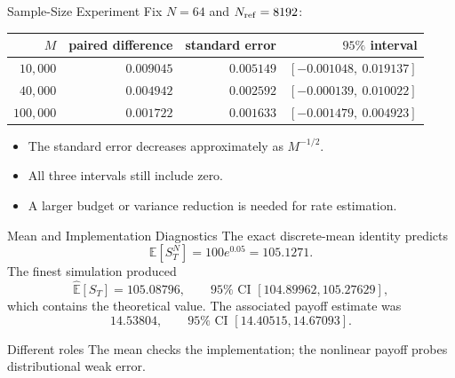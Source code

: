 \documentclass[aspectratio=169,10pt]{beamer}
\newcommand{\E}{\mathbb{E}}
\begin{document}
\begin{frame}{Sample-Size Experiment}
  Fix $N=64$ and $N_{\rm ref}=8192$:
  \begin{center}
    \begin{tabular}{rrrr}
      \toprule
      $M$ & paired difference & standard error & $95\%$ interval \\
      \midrule
      $10{,}000$  & $0.009045$ & $0.005149$ & $[-0.001048,\ 0.019137]$ \\
      $40{,}000$  & $0.004942$ & $0.002592$ & $[-0.000139,\ 0.010022]$ \\
      $100{,}000$ & $0.001722$ & $0.001633$ & $[-0.001479,\ 0.004923]$ \\
      \bottomrule
    \end{tabular}
  \end{center}
  \begin{itemize}
    \item The standard error decreases approximately as $M^{-1/2}$.
    \item All three intervals still include zero.
    \item A larger budget or variance reduction is needed for rate estimation.
  \end{itemize}
\end{frame}

\begin{frame}{Mean and Implementation Diagnostics}
  The exact discrete-mean identity predicts
  \[
    \E[S_T^N]=100e^{0.05}=105.1271.
  \]
  The finest simulation produced
  \[
    \widehat{\E}[S_T]=105.08796,
    \qquad 95\%\text{ CI }[104.89962,105.27629],
  \]
  which contains the theoretical value. The associated payoff estimate was
  \[
    14.53804,\qquad 95\%\text{ CI }[14.40515,14.67093].
  \]
  \begin{block}{Different roles}
    The mean checks the implementation; the nonlinear payoff probes distributional weak error.
  \end{block}
\end{frame}
\end{document}
